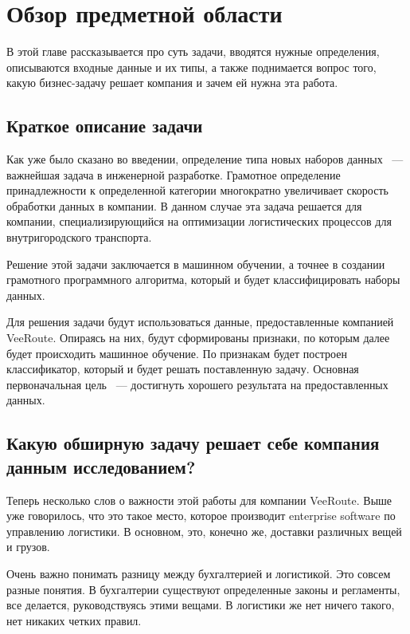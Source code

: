 \chapter{Обзор предметной области }

В этой главе рассказывается про суть задачи, вводятся нужные определения, описываются входные данные и их типы, а также поднимается вопрос того, какую бизнес-задачу решает компания и зачем ей нужна эта работа.

\section{Краткое описание задачи}

Как уже было сказано во введении, определение типа новых наборов данных ~--- важнейшая задача в инженерной разработке.
Грамотное определение принадлежности к определенной категории многократно увеличивает скорость обработки данных в компании.
В данном случае эта задача решается для компании, специализирующийся на оптимизации логистических процессов для внутригородского транспорта.

Решение этой задачи заключается в машинном обучении, а точнее в создании грамотного программного алгоритма, который и будет классифицировать наборы данных.

Для решения задачи будут использоваться данные, предоставленные компанией VeeRoute.
Опираясь на них, будут сформированы признаки, по которым далее будет происходить машинное обучение.
По признакам будет построен классификатор, который и будет решать поставленную задачу.
Основная первоначальная цель ~--- достигнуть хорошего результата на предоставленных данных.

\section{Какую обширную задачу решает себе компания данным исследованием?}

Теперь несколько слов о важности этой работы для компании VeeRoute.
Выше уже говорилось, что это такое место, которое производит enterprise software по управлению логистики.
В основном, это, конечно же, доставки различных вещей и грузов.

Очень важно понимать разницу между бухгалтерией и логистикой.
Это совсем разные понятия.
В бухгалтерии существуют определенные законы и регламенты, все делается, руководствуясь этими вещами.
В логистики же нет ничего такого, нет никаких четких правил.

